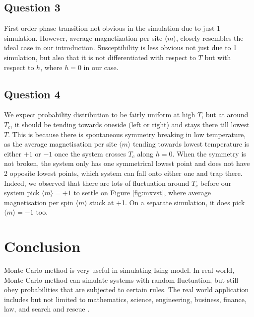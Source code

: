 \documentclass[a4paper]{article}
\numberwithin{equation}{section}
\begin{document}
\subsection{Question 3}
First order phase transition not obvious in the simulation due to just 1 simulation. However, average magnetization per site $\langle m \rangle$, closely resembles the ideal case in our introduction. Susceptibility is less obvious not just due to 1 simulation, but also that it is not differentiated with respect to $T$ but with respect to $h$, where $h=0$ in our case. 
\subsection{Question 4}
We expect probability distribution to be fairly uniform at high $T$, but at around $T_c$, it should be tending towards oneside (left or right) and stays there till lowest $T$. This is because there is spontaneous symmetry breaking in low temperature, as the average magnetisation per site $\langle m \rangle$ tending towards lowest temperature is either $+1$ or $-1$ once the system crosses $T_c$ along $h=0$. When the symmetry is not broken, the system only has one symmetrical lowest point and does not have  2 opposite lowest points, which system can fall onto either one and trap there. Indeed, we observed that there are lots of fluctuation around $T_c$ before our system pick $\langle m \rangle=+1$ to settle on Figure \ref{fig:mxvst}, where average magnetisation per spin $\langle m \rangle$ stuck at +1. On a separate simulation, it does pick $\langle m \rangle=-1$ too.
\section{Conclusion}
Monte Carlo method is very useful in simulating Ising model. In real world, Monte Carlo method can simulate systems with random fluctuation, but still obey probabilities that are subjected to certain rules. The real world application includes but not limited to mathematics, science, engineering, business, finance, law, and search and rescue \cite{wiki}.
\printbibliography
\end{document}
